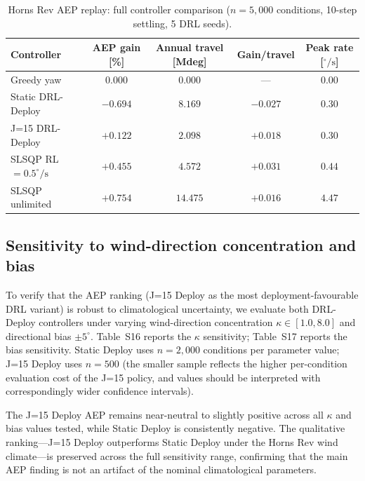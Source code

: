 \documentclass{article}
\begin{document}
\begin{table}[h]
\centering
\caption{Horns Rev AEP replay: full controller comparison ($n{=}5{,}000$ conditions, 10-step settling, 5 DRL seeds).}
\label{tab:aep_full}
\small
\begin{tabular}{lcccc}
\toprule
Controller & AEP gain [\%] & Annual travel [Mdeg] & Gain/travel & Peak rate [$^\circ\!/\!\mathrm{s}$] \\
\midrule
Greedy yaw          & $0.000$ & $0.000$ & ---      & $0.00$ \\
Static DRL-Deploy   & $-0.694$ & $8.169$ & $-0.027$ & $0.30$ \\
J=15 DRL-Deploy     & $+0.122$ & $2.098$ & $+0.018$ & $0.30$ \\
SLSQP RL$=0.5^\circ\!/\!\mathrm{s}$ & $+0.455$ & $4.572$ & $+0.031$ & $0.44$ \\
SLSQP unlimited     & $+0.754$ & $14.475$ & $+0.016$ & $4.47$ \\
\bottomrule
\end{tabular}
\end{table}

\subsection{Sensitivity to wind-direction concentration and bias}

To verify that the AEP ranking (J=15 Deploy as the most deployment-favourable DRL variant) is robust to climatological uncertainty, we evaluate both DRL-Deploy controllers under varying wind-direction concentration $\kappa{\in}[1.0,8.0]$ and directional bias $\pm5^\circ$. Table~S16 reports the $\kappa$ sensitivity; Table~S17 reports the bias sensitivity. Static Deploy uses $n{=}2{,}000$ conditions per parameter value; J=15 Deploy uses $n{=}500$ (the smaller sample reflects the higher per-condition evaluation cost of the J=15 policy, and values should be interpreted with correspondingly wider confidence intervals).

The J=15 Deploy AEP remains near-neutral to slightly positive across all $\kappa$ and bias values tested, while Static Deploy is consistently negative. The qualitative ranking---J=15 Deploy outperforms Static Deploy under the Horns Rev wind climate---is preserved across the full sensitivity range, confirming that the main AEP finding is not an artifact of the nominal climatological parameters.
\end{document}
